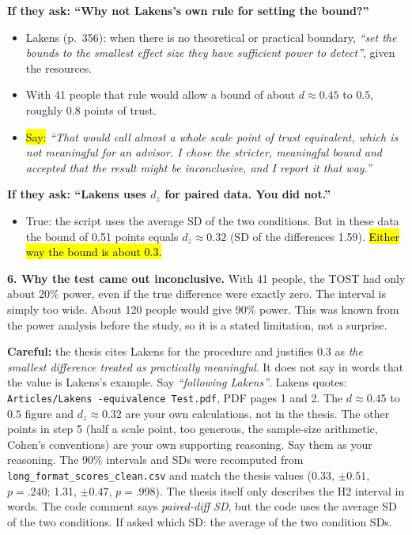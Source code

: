 \documentclass[11pt,a4paper]{article}
\newcommand{\key}[1]{\hl{#1}}
\newcommand{\careful}[1]{{\color{knred}\textbf{Careful:} #1}\par}
\begin{document}
\textbf{If they ask: ``Why not Lakens's own rule for setting the bound?''}
\begin{itemize}
  \item Lakens (p.~356): when there is no theoretical or practical boundary, \emph{``set the bounds to the smallest effect size they have sufficient power to detect''}, given the resources.
  \item With 41 people that rule would allow a bound of about $d\approx0.45$ to $0.5$, roughly 0.8 points of trust.
  \item \key{Say:} \emph{``That would call almost a whole scale point of trust equivalent, which is not meaningful for an advisor. I chose the stricter, meaningful bound and accepted that the result might be inconclusive, and I report it that way.''}
\end{itemize}

\textbf{If they ask: ``Lakens uses $d_z$ for paired data. You did not.''}
\begin{itemize}
  \item True: the script uses the average SD of the two conditions. But in these data the bound of 0.51 points equals $d_z\approx0.32$ (SD of the differences 1.59). \key{Either way the bound is about 0.3.}
\end{itemize}

\textbf{6. Why the test came out inconclusive.} With 41 people, the TOST had only about 20\% power, even if the true difference were exactly zero. The interval is simply too wide. About 120 people would give 90\% power. This was known from the power analysis before the study, so it is a stated limitation, not a surprise.

\careful{the thesis cites Lakens for the procedure and justifies $0.3$ as \emph{the smallest difference treated as practically meaningful}. It does not say in words that the value is Lakens's example. Say \emph{``following Lakens''}. Lakens quotes: \texttt{Articles/Lakens -equivalence Test.pdf}, PDF pages 1 and 2. The $d\approx0.45$ to $0.5$ figure and $d_z\approx0.32$ are your own calculations, not in the thesis. The other points in step 5 (half a scale point, too generous, the sample-size arithmetic, Cohen's conventions) are your own supporting reasoning. Say them as your reasoning. The 90\% intervals and SDs were recomputed from \texttt{long\_format\_scores\_clean.csv} and match the thesis values (0.33, $\pm0.51$, $p=.240$; 1.31, $\pm0.47$, $p=.998$). The thesis itself only describes the H2 interval in words. The code comment says \emph{paired-diff SD}, but the code uses the average SD of the two conditions. If asked which SD: the average of the two condition SDs.}
\end{document}
